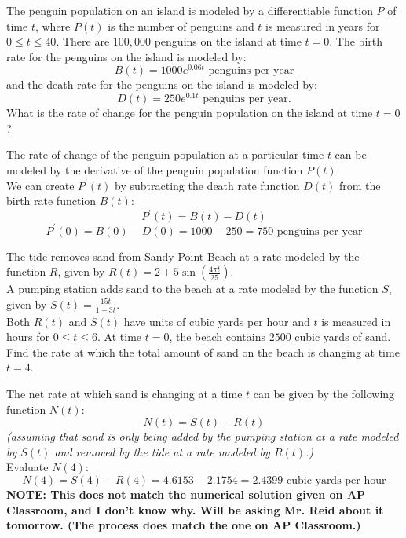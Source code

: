 \documentclass[12pt,letterpaper, onecolumn]{exam}
\begin{document}
\begin{questions}
\pagebreak

\question
The penguin population on an island is modeled by a differentiable function $P$ of time $t$, where $P(t)$ is the number of penguins and $t$ is measured in years for $0 \leq t \leq 40$. There are $100,000$ penguins on the island at time $t = 0$. The birth rate for the penguins on the island is modeled by:
$$B(t) = 1000e^{0.06t} \text{ penguins per year}$$ 
and the death rate for the penguins on the island is modeled by:
$$D(t)=250e^{0.1t} \text{ penguins per year.}$$
What is the rate of change for the penguin population on the island at time $t = 0$?
\begin{solution}
	The rate of change of the penguin population at a particular time $t$ can be modeled by the derivative of the penguin population function $P(t)$. \\
	We can create $P^\prime(t)$ by subtracting the death rate function $D(t)$ from the birth rate function $B(t)$:
	$$P^\prime(t)=B(t)-D(t)$$
	$$P^\prime(0)=B(0)-D(0) = 1000-250 = \boxed{750 \text{ penguins per year}}$$
\end{solution}


\pagebreak

\question
The tide removes sand from Sandy Point Beach at a rate modeled by the function $R$, given by $R(t)=2+5\sin(\frac{4\pi t}{25})$. \\
A pumping station adds sand to the beach at a rate modeled by the function $S$, given by $S(t)=\frac{15t}{1+3t}$. \\
Both $R(t)$ and $S(t)$ have units of cubic yards per hour and $t$ is measured in hours for $0 \leq t \leq 6$. At time $t = 0$, the beach contains $2500$ cubic yards of sand. \\
Find the rate at which the total amount of sand on the beach is changing at time $t = 4$.

\begin{solution}
	The net rate at which sand is changing at a time $t$ can be given by the following function $N(t)$:
	$$N(t)=S(t)-R(t)$$
	\emph{(assuming that sand is only being added by the pumping station at a rate modeled by $S(t)$ and removed by the tide at a rate modeled by $R(t)$.)} \\
	Evaluate $N(4)$:
	$$N(4)=S(4)-R(4)=4.6153-2.1754=\boxed{2.4399 \text{ cubic yards per hour}}$$
	{\textbf{\color{red}  NOTE: This does not match the numerical solution given on AP Classroom, and I don't know why. Will be asking Mr. Reid about it tomorrow. (The process does match the one on AP Classroom.)}}
\end{solution}


\end{questions}
\end{document}
